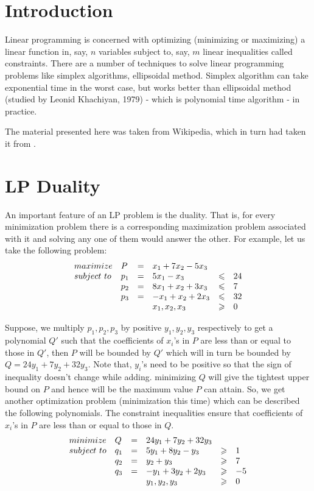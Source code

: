 
\section{Introduction}
Linear programming is concerned with optimizing (minimizing or maximizing) a linear function in, say, $n$ variables subject to, say, $m$ linear inequalities called constraints. There are a number of techniques to solve linear programming problems like simplex algorithms, ellipsoidal method. Simplex algorithm can take exponential time in the worst case, but works better than ellipsoidal method (studied by Leonid Khachiyan, 1979) - which is polynomial time algorithm - in practice.

The material presented here was taken from Wikipedia, which in turn had taken it from \cite{linear}.
\section{LP Duality}
An important feature of an LP problem is the duality. That is, for every minimization problem there is a corresponding maximization problem associated with it and solving any one of them would answer the other. For example, let us take the following problem:
\[
\begin{array}{l l c l c l}
maximize & P  & = & x_1 + 7x_2 - 5x_3 &  & \\
subject \,\, to & p_1 & = & 5x_1 - x_3  & \leqslant & 24\\
		 & p_2 &=& 8x_1 + x_2 + 3x_3 & \leqslant & 7 \\
		 & p_3 &=& -x_1 + x_2 + 2x_3 & \leqslant & 32 \\
		 & & & x_1,x_2,x_3 & \geqslant & 0
\end{array} 
\]

Suppose, we multiply $p_1,p_2,p_3$ by positive $y_1,y_2,y_3$ respectively to get a polynomial $Q'$ such that the coefficients of $x_i$'s in $P$ are less than or equal to those in $Q'$, then $P$ will be bounded by $Q'$ which will in turn be bounded by $Q = 24y_1 + 7y_2 + 32y_3$. Note that, $y_i$'s need to be positive so that the sign of inequality doesn't change while adding. minimizing $Q$ will give the tightest upper bound on $P$ and hence will be the maximum value $P$ can attain. So, we get another optimization problem (minimization this time) which can be described the following polynomials. The constraint inequalities ensure that coefficients of $x_i$'s in $P$ are less than or equal to those in $Q$.
\[
\begin{array}{l l c l c l}
minimize & Q  & = & 24y_1 + 7y_2 + 32y_3 &  & \\
subject \,\, to & q_1 & = & 5y_1 + 8y_2 - y_3  & \geqslant & 1\\
		 & q_2 &=& y_2 + y_3 & \geqslant & 7 \\
		 & q_3 &=& -y_1 + 3y_2 + 2y_3 & \geqslant & -5 \\
		 & & & y_1,y_2,y_3 & \geqslant & 0
\end{array} 
\]


